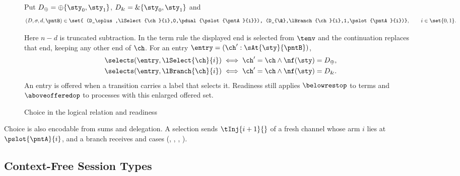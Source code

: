 \begin{figure}[tp]
  \adjustfigure[]
  Put $D_\oplus=\oplus\{\sty_0,\sty_1\}$,
  $D_{\&}=\&\{\sty_0,\sty_1\}$ and
  \[
    (D,\sigma,d,\pntB)\in\set{
      (D_\oplus,\lSelect{\ch}{i},0,\pdual{\pslot{\pntA}{i}}),
      (D_{\&},\lBranch{\ch}{i},1,\pslot{\pntA}{i})},\qquad i\in\set{0,1}.
  \]
  Here $n-d$ is truncated subtraction. In the term rule the displayed
  end is selected from $\tenv$ and the continuation replaces that end,
  keeping any other end of $\ch$.
  For an entry $\entry=(\ch':\sAt{\sty}{\pntB})$,
  \begin{align*}
    \selects(\entry,\lSelect{\ch}{i})
      &\iff \ch'=\ch\land\nf(\sty)=D_\oplus,\\
    \selects(\entry,\lBranch{\ch}{i})
      &\iff \ch'=\ch\land\nf(\sty)=D_{\&}.
  \end{align*}
  An entry is offered when a transition carries a label that selects it.
  Readiness still applies $\belowrestop$ to terms and
  $\aboveofferedop$ to processes with this enlarged offered set.
  \caption{Choice in the logical relation and readiness}
  \label{fig:choice-relation}
\end{figure}

Choice is also encodable from sums and delegation. A selection sends
$\tInj{i+1}{}$ of a fresh channel whose arm $i$ lies at $\pslot{\pntA}{i}$, and a
branch receives and cases (, ,
, ).

\subsection{Context-Free Session Types}
\label{sec:ext-cfst}

